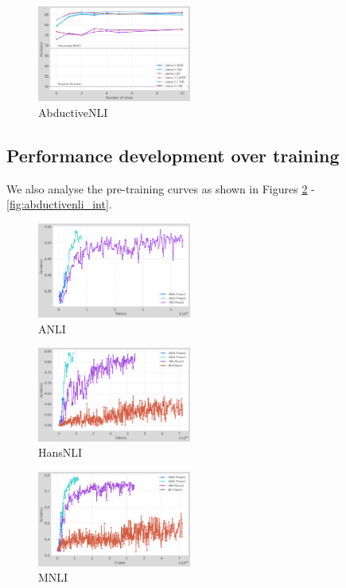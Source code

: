 \begin{figure}[t]
    \centering
    \includegraphics[width=0.45\textwidth]{nli_plots/abductivenli.png}
    \caption{AbductiveNLI}
    \label{fig:abductivenli}
\end{figure}

\subsection{Performance development over training}

We also analyse the pre-training curves as shown in Figures \ref{fig:anli_int} - \ref{fig:abductivenli_int}.

\begin{figure}[t]
    \centering
    \includegraphics[width=0.45\textwidth]{nli_plots/anli_intermediate.png}
    \caption{ANLI}
    \label{fig:anli_int}
\end{figure}

\begin{figure}[t]
    \centering
    \includegraphics[width=0.45\textwidth]{nli_plots/hansnli_intermediate.png}
    \caption{HansNLI}
    \label{fig:hansnli_int}
\end{figure}

\begin{figure}[t]
    \centering
    \includegraphics[width=0.45\textwidth]{nli_plots/mnli_matched_intermediate.png}
    \caption{MNLI}
    \label{fig:mnli_int}
\end{figure}

